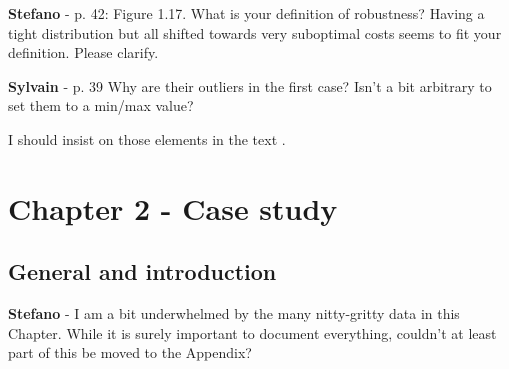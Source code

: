 \documentclass[12pt,a4paper]{article}
\begin{document}
\begin{mdframed}[style=comment] %
{\color{orange} \textbf{Stefano}} - p. 42: Figure 1.17. What is your definition of robustness? Having a tight distribution but all shifted towards very suboptimal costs seems to fit your definition. Please clarify.
\end{mdframed}

\noindent 

\begin{mdframed}[style=manuscript] %

\end{mdframed}

\begin{mdframed}[style=comment] %
{\color{purple} \textbf{Sylvain}} - p. 39 Why are their outliers in the first case? Isn't a bit arbitrary to set them to a min/max value?
\end{mdframed}

\noindent I should insist on those elements in the text {\color{blue} }.

\begin{mdframed}[style=manuscript] %

\end{mdframed}

\section{Chapter 2 - Case study}
\label{case_study}

\subsection{General and introduction}
\label{methodo_general}

\begin{mdframed}[style=comment] %
{\color{orange} \textbf{Stefano}} - I am a bit underwhelmed by the many nitty-gritty data in this Chapter. While it is surely important to document everything, couldn’t at least part of this be moved to the Appendix?\end{mdframed}

\noindent 

\begin{mdframed}[style=manuscript] %

\end{mdframed}
\end{document}
